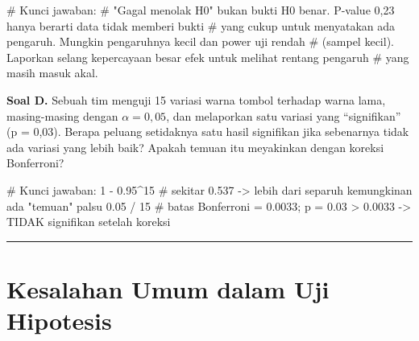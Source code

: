 \documentclass[
  indonesian,
  letterpaper,
]{book}
\newenvironment{Shaded}{\begin{snugshade}}{\end{snugshade}}
\newcommand{\CommentTok}[1]{\textcolor[rgb]{0.37,0.37,0.37}{#1}}
\newcommand{\DecValTok}[1]{\textcolor[rgb]{0.68,0.00,0.00}{#1}}
\newcommand{\FloatTok}[1]{\textcolor[rgb]{0.68,0.00,0.00}{#1}}
\newcommand{\SpecialCharTok}[1]{\textcolor[rgb]{0.37,0.37,0.37}{#1}}
\begin{document}
\begin{Shaded}
\begin{Highlighting}[]
\CommentTok{\# Kunci jawaban:}
\CommentTok{\# "Gagal menolak H0" bukan bukti H0 benar. P{-}value 0,23 hanya berarti data tidak memberi bukti}
\CommentTok{\# yang cukup untuk menyatakan ada pengaruh. Mungkin pengaruhnya kecil dan power uji rendah}
\CommentTok{\# (sampel kecil). Laporkan selang kepercayaan besar efek untuk melihat rentang pengaruh}
\CommentTok{\# yang masih masuk akal.}
\end{Highlighting}
\end{Shaded}

\textbf{Soal D.} Sebuah tim menguji 15 variasi warna tombol terhadap
warna lama, masing-masing dengan \(\alpha = 0{,}05\), dan melaporkan
satu variasi yang ``signifikan'' (p = 0,03). Berapa peluang setidaknya
satu hasil signifikan jika sebenarnya tidak ada variasi yang lebih baik?
Apakah temuan itu meyakinkan dengan koreksi Bonferroni?

\begin{Shaded}
\begin{Highlighting}[]
\CommentTok{\# Kunci jawaban:}
\DecValTok{1} \SpecialCharTok{{-}} \FloatTok{0.95}\SpecialCharTok{\^{}}\DecValTok{15}   \CommentTok{\# sekitar 0.537 {-}\textgreater{} lebih dari separuh kemungkinan ada "temuan" palsu}
\FloatTok{0.05} \SpecialCharTok{/} \DecValTok{15}     \CommentTok{\# batas Bonferroni = 0.0033; p = 0.03 \textgreater{} 0.0033 {-}\textgreater{} TIDAK signifikan setelah koreksi}
\end{Highlighting}
\end{Shaded}

\begin{center}\rule{0.5\linewidth}{0.5pt}\end{center}


\chapter{Kesalahan Umum dalam Uji
Hipotesis}\label{kesalahan-umum-dalam-uji-hipotesis}
\end{document}
